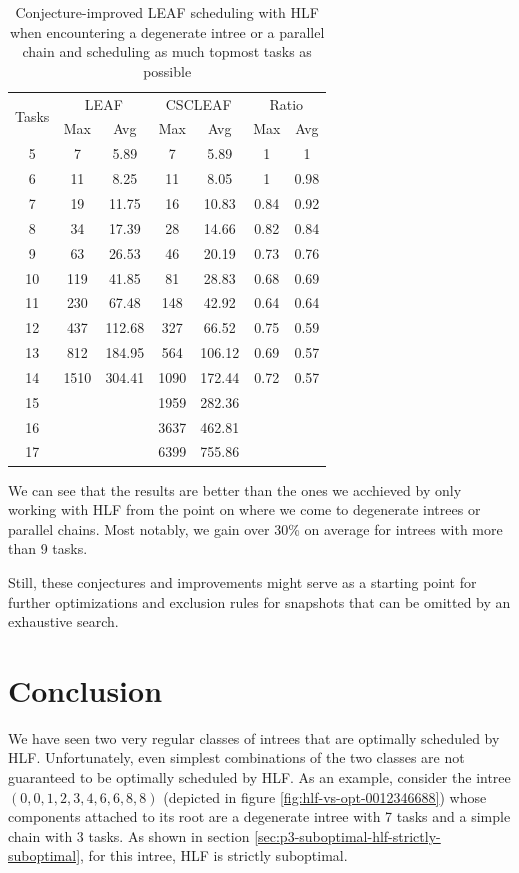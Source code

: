 \begin{table}[th]
  \centering
  \begin{tabular}[ht]{ccccccc}
    \multirow{2}{*}{Tasks} & \multicolumn{2}{c}{LEAF} & \multicolumn{2}{c}{CSCLEAF} & \multicolumn{2}{c}{Ratio}\\
    &  Max & Avg & Max & Avg & Max & Avg\\
    \hline
    5 & 7 & 5.89 & 7 & 5.89 & 1 & 1\\
    6 & 11 & 8.25 & 11 & 8.05 & 1 & 0.98\\
    7 & 19 & 11.75 & 16 & 10.83 & 0.84 & 0.92 \\
    8 & 34 & 17.39 & 28 & 14.66 & 0.82 & 0.84 \\
    9 & 63 & 26.53 & 46 & 20.19 & 0.73 & 0.76 \\
    10 & 119 & 41.85 & 81 & 28.83 & 0.68 & 0.69 \\
    11 & 230 & 67.48 & 148 & 42.92 & 0.64 & 0.64 \\
    12 & 437 & 112.68 & 327 & 66.52 & 0.75 & 0.59 \\
    13 & 812 & 184.95 & 564 & 106.12 & 0.69 & 0.57 \\
    14 & 1510 & 304.41 & 1090 & 172.44 & 0.72 & 0.57 \\
    15 &  &  & 1959 & 282.36 & &  \\
    16 &  &  & 3637 & 462.81 & &  \\
    17 &  &  & 6399 & 755.86 & &  
  \end{tabular}
  \caption{Conjecture-improved LEAF scheduling with HLF when encountering a degenerate intree or a parallel chain and scheduling as much topmost tasks as possible}
  \label{tab:improving-improved-leaf-scheduler-benchmark}
\end{table}

We can see that the results are better than the ones we acchieved by only working with HLF from the point on where we come to degenerate intrees or parallel chains. Most notably, we gain over 30\% on average for intrees with more than 9 tasks.

Still, these conjectures and improvements might serve as a starting point for further optimizations and exclusion rules for snapshots that can be omitted by an exhaustive search.

\section{Conclusion}
\label{sec:properties-schedules-conclusion}

We have seen two very regular classes of intrees that are optimally scheduled by HLF. Unfortunately, even simplest combinations of the two classes are not guaranteed to be optimally scheduled by HLF. As an example, consider the intree $(0,0,1,2,3,4,6,6,8,8)$ (depicted in figure \ref{fig:hlf-vs-opt-0012346688}) whose components attached to its root are a degenerate intree with 7 tasks and a simple chain with 3 tasks. As shown in section \ref{sec:p3-suboptimal-hlf-strictly-suboptimal}, for this intree, HLF is strictly suboptimal.

